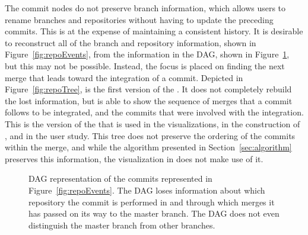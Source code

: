 The commit nodes do not preserve branch information, which allows users
to rename branches and repositories without having to update the
preceding commits.
This is at the expense of maintaining a consistent history.
It is desirable to reconstruct all of the branch and repository
information, shown in Figure~\ref{fig:repoEvents}, from the information
in the DAG, shown in Figure~\ref{fig:repoDAG}, but this may not be
possible.
Instead, the focus is placed on finding the next merge that leads toward
the integration of a commit.
Depicted in Figure~\ref{fig:repoTree}, is the first version of the \mt{}.
It does not completely rebuild the lost information, but is able to
show the sequence of merges that a commit follows to be integrated,
and the commits that were involved with the integration.
This is the version of the \mt{} that is used in the visualizations, in
the construction of \tool{}, and in the user study.
This tree does not preserve the ordering of the commits within the
merge, and while the algorithm presented in Section~\ref{sec:algorithm}
preserves this information, the visualization in \tool{} does not make
use of it.

\begin{figure}[htbp]
  \centering
  \caption{DAG representation of the commits represented in
    Figure~\ref{fig:repoEvents}. The DAG loses information about which
    repository the commit is performed in and through which merges it
    has passed on its way to the master branch. The DAG does not even
    distinguish the master branch from other branches.}
  \label{fig:repoDAG}
\end{figure}

